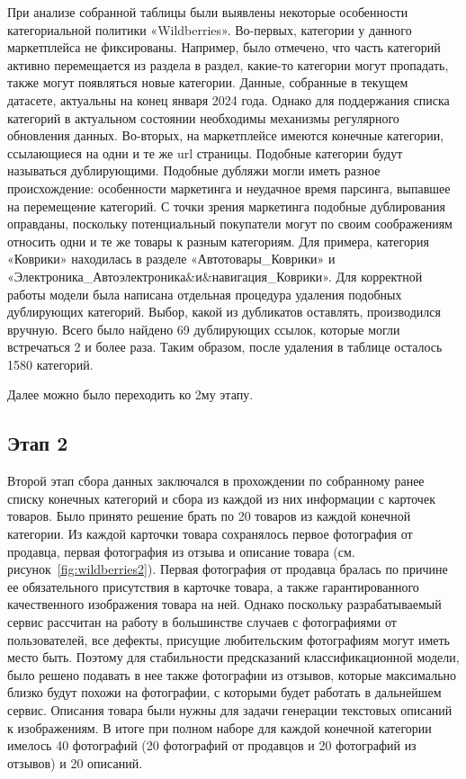 \documentclass[a4paper,12pt]{extarticle}
\begin{document}
При анализе собранной таблицы были выявлены некоторые особенности категориальной политики «Wildberries». Во-первых, категории у данного маркетплейса не фиксированы. Например, было отмечено, что часть категорий активно перемещается из раздела в раздел, какие-то категории могут пропадать, также могут появляться новые категории. Данные, собранные в текущем датасете, актуальны на конец января 2024 года. Однако для поддержания списка категорий в актуальном состоянии необходимы механизмы регулярного обновления данных. Во-вторых, на маркетплейсе имеются конечные категории, ссылающиеся на одни и те же url страницы. Подобные категории будут называться дублирующими. Подобные дубляжи могли иметь разное происхождение: особенности маркетинга и неудачное время парсинга, выпавшее на перемещение категорий. С точки зрения маркетинга подобные дублирования оправданы, поскольку потенциальный покупатели могут по своим соображениям относить одни и те же товары к разным категориям. Для примера, категория «Коврики» находилась в разделе «Автотовары\_Коврики» и «Электроника\_Автоэлектроника\&и\&навигация\_Коврики». Для корректной работы модели была написана отдельная процедура удаления подобных дублирующих категорий. Выбор, какой из дубликатов оставлять, производился вручную. Всего было найдено 69 дублирующих ссылок, которые могли встречаться 2 и более раза. Таким образом, после удаления в таблице осталось 1580 категорий.

Далее можно было переходить ко 2му этапу.


\subsection{Этап 2}

Второй этап сбора данных заключался в прохождении по собранному ранее списку конечных категорий и сбора из каждой из них информации с карточек товаров. Было принято решение брать по 20 товаров из каждой конечной категории. Из каждой карточки товара сохранялось первое фотография от продавца, первая фотография из отзыва и описание товара (см. рисунок~\ref{fig:wildberries2}). Первая фотография от продавца бралась по причине ее обязательного присутствия в карточке товара, а также гарантированного качественного изображения товара на ней. Однако поскольку разрабатываемый сервис рассчитан на работу в большинстве случаев с фотографиями от пользователей, все дефекты, присущие любительским фотографиям могут иметь место быть. Поэтому для стабильности предсказаний классификационной модели, было решено подавать в нее также фотографии из отзывов, которые максимально близко будут похожи на фотографии, с которыми будет работать в дальнейшем сервис. Описания товара были нужны для задачи генерации текстовых описаний к изображениям. В итоге при полном наборе для каждой конечной категории имелось 40 фотографий (20 фотографий от продавцов и 20 фотографий из отзывов) и 20 описаний.
\end{document}
